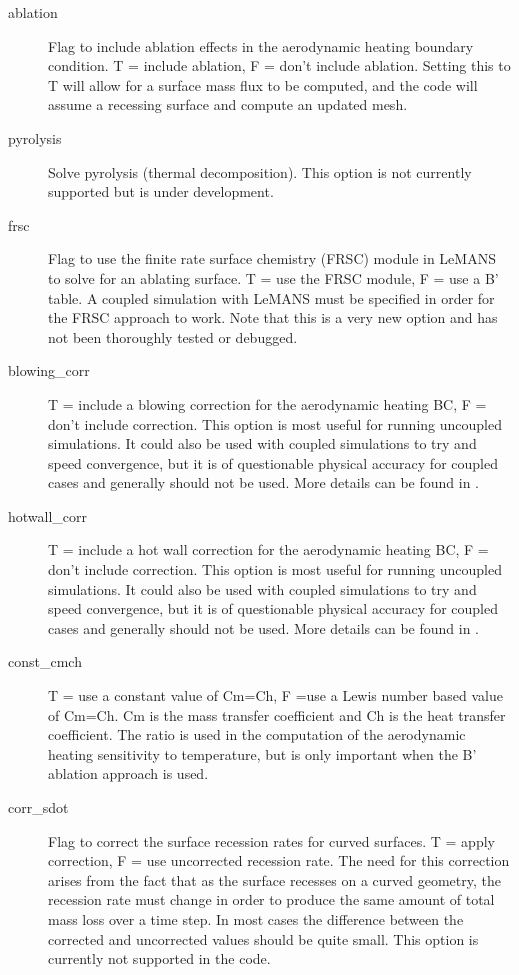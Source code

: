 \documentclass[]{article}
\begin{document}
\begin{description}
\item[ablation] Flag to include ablation effects in the aerodynamic heating boundary condition. T = include ablation, F = don't include ablation. Setting this to T will allow for a surface mass flux to be computed, and the code will assume a recessing surface and compute an updated mesh.
\item[pyrolysis] Solve pyrolysis (thermal decomposition).  This option is not currently supported but is under development.
\item[frsc] Flag to use the finite rate surface chemistry (FRSC) module in LeMANS to solve for an ablating surface. T = use the FRSC module, F = use a B' table. A coupled simulation with LeMANS must be specified in order for the FRSC approach to work. Note that this is a very new option and has not been thoroughly tested or debugged.
\item[blowing\_corr] T = include a blowing correction for the aerodynamic heating BC, F = don't include correction. This option is most useful for running uncoupled simulations. It could also be used with coupled simulations to try and speed convergence, but it is of questionable physical accuracy for coupled cases and generally should not be used. More details can be found in \cite{amar_thesis}.
\item[hotwall\_corr] T = include a hot wall correction for the aerodynamic heating BC, F = don't include correction. This option is most useful for running uncoupled simulations. It could also be used with coupled simulations to try and speed convergence, but it is of questionable physical accuracy for coupled cases and generally should not be used. More details can be found in \cite{amar_thesis}.
\item[const\_cmch] T = use a constant value of Cm=Ch, F =use a Lewis number based value of Cm=Ch. Cm is the mass transfer coefficient and Ch is the heat transfer coefficient. The ratio is used in the computation of the aerodynamic heating sensitivity to temperature, but is only important when the B' ablation approach is used.
\item[corr\_sdot] Flag to correct the surface recession rates for curved surfaces. T = apply correction, F = use uncorrected recession rate. The need for this correction arises from the fact that as the surface recesses on a curved geometry, the recession rate must change in order to produce the same amount of total mass loss over a time step. In most cases the difference between the corrected and uncorrected values should be quite small. This option is currently not supported in the code.

\end{description}
\end{document}
